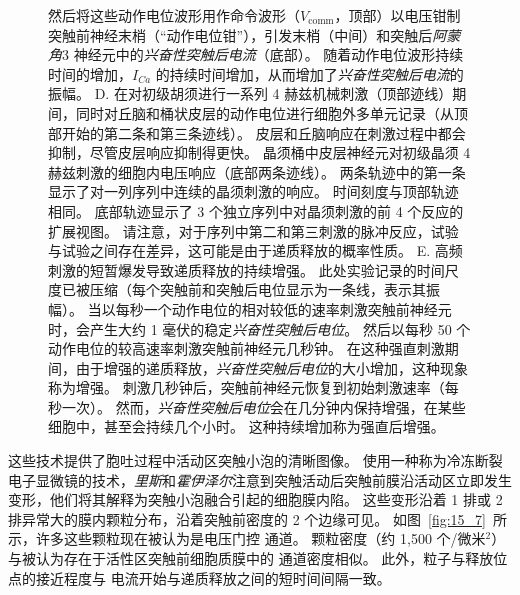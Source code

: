 \begin{figure}[htbp]
{		然后将这些动作电位波形用作命令波形（$V_\text{comm}$，顶部）以电压钳制突触前神经末梢（“动作电位钳”），引发末梢（中间）和突触后\textit{阿蒙角}3 神经元中的\textit{兴奋性突触后电流}（底部）。
		随着动作电位波形持续时间的增加，$I_{Ca}$ 的持续时间增加，从而增加了\textit{兴奋性突触后电流}的振幅\cite{geiger2000dynamic}。
		D. 在对初级胡须进行一系列 4 赫兹机械刺激（顶部迹线）期间，同时对丘脑和桶状皮层的动作电位进行细胞外多单元记录（从顶部开始的第二条和第三条迹线）。
		皮层和丘脑响应在刺激过程中都会抑制，尽管皮层响应抑制得更快。
		晶须桶中皮层神经元对初级晶须 4 赫兹刺激的细胞内电压响应（底部两条迹线）。
		两条轨迹中的第一条显示了对一列序列中连续的晶须刺激的响应。
		时间刻度与顶部轨迹相同。
		底部轨迹显示了 3 个独立序列中对晶须刺激的前 4 个反应的扩展视图。
		请注意，对于序列中第二和第三刺激的脉冲反应，试验与试验之间存在差异，这可能是由于递质释放的概率性质\cite{chung2002short}。
		E. 高频刺激的短暂爆发导致递质释放的持续增强。
		此处实验记录的时间尺度已被压缩（每个突触前和突触后电位显示为一条线，表示其振幅）。
		当以每秒一个动作电位的相对较低的速率刺激突触前神经元时，会产生大约 1 毫伏的稳定\textit{兴奋性突触后电位}。
		然后以每秒 50 个动作电位的较高速率刺激突触前神经元几秒钟。
		在这种强直刺激期间，由于增强的递质释放，\textit{兴奋性突触后电位}的大小增加，这种现象称为增强。
		刺激几秒钟后，突触前神经元恢复到初始刺激速率（每秒一次）。
		然而，\textit{兴奋性突触后电位}会在几分钟内保持增强，在某些细胞中，甚至会持续几个小时。
		这种持续增加称为强直后增强。}
	\label{fig:15_15}
\end{figure}


这些技术提供了胞吐过程中活动区突触小泡的清晰图像。 
使用一种称为冷冻断裂电子显微镜的技术，\textit{里斯}和\textit{霍伊泽尔}注意到突触活动后突触前膜沿活动区立即发生变形，他们将其解释为突触小泡融合引起的细胞膜内陷。 
这些变形沿着 1 排或 2 排异常大的膜内颗粒分布，沿着突触前密度的 2 个边缘可见。
如图~\ref{fig:15_7}~所示，许多这些颗粒现在被认为是电压门控  通道。
颗粒密度（约 1,500 个/微米$ ^2 $）与被认为存在于活性区突触前细胞质膜中的  通道密度相似。
此外，粒子与释放位点的接近程度与  电流开始与递质释放之间的短时间间隔一致。


